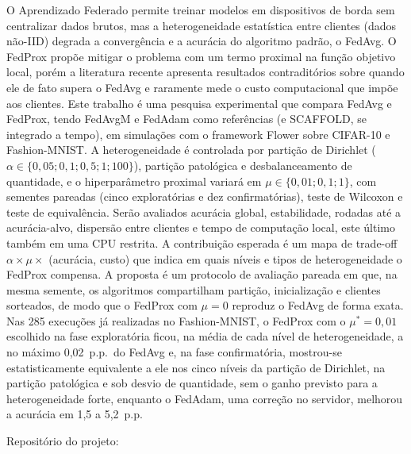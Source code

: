 O Aprendizado Federado permite treinar modelos em dispositivos de borda sem centralizar dados brutos, mas a heterogeneidade estatística entre clientes (dados não-IID) degrada a convergência e a acurácia do algoritmo padrão, o FedAvg. O FedProx propõe mitigar o problema com um termo proximal na função objetivo local, porém a literatura recente apresenta resultados contraditórios sobre quando ele de fato supera o FedAvg e raramente mede o custo computacional que impõe aos clientes. Este trabalho é uma pesquisa experimental que compara FedAvg e FedProx, tendo FedAvgM e FedAdam como referências (e SCAFFOLD, se integrado a tempo), em simulações com o framework Flower sobre CIFAR-10 e Fashion-MNIST. A heterogeneidade é controlada por partição de Dirichlet ($\alpha \in \{0{,}05; 0{,}1; 0{,}5; 1; 100\}$), partição patológica e desbalanceamento de quantidade, e o hiperparâmetro proximal variará em $\mu \in \{0{,}01; 0{,}1; 1\}$, com sementes pareadas (cinco exploratórias e dez confirmatórias), teste de Wilcoxon e teste de equivalência. Serão avaliados acurácia global, estabilidade, rodadas até a acurácia-alvo, dispersão entre clientes e tempo de computação local, este último também em uma CPU restrita. A contribuição esperada é um mapa de trade-off $\alpha \times \mu \times$ (acurácia, custo) que indica em quais níveis e tipos de heterogeneidade o FedProx compensa. A proposta é um protocolo de avaliação pareada em que, na mesma semente, os algoritmos compartilham partição, inicialização e clientes sorteados, de modo que o FedProx com $\mu = 0$ reproduz o FedAvg de forma exata. Nas 285 execuções já realizadas no Fashion-MNIST, o FedProx com o $\mu^* = 0{,}01$ escolhido na fase exploratória ficou, na média de cada nível de heterogeneidade, a no máximo 0,02~p.p.\ do FedAvg e, na fase confirmatória, mostrou-se estatisticamente equivalente a ele nos cinco níveis da partição de Dirichlet, na partição patológica e sob desvio de quantidade, sem o ganho previsto para a heterogeneidade forte, enquanto o FedAdam, uma correção no servidor, melhorou a acurácia em 1,5 a 5,2~p.p.

Repositório do projeto: \linkProjeto
